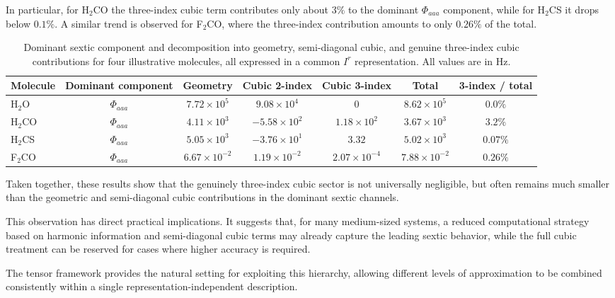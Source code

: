 \documentclass[aip,jcp,reprint,floatfix]{revtex4-2}
\begin{document}
In particular, for H$_2$CO the three-index cubic term contributes
only about $3\%$ to the dominant $\Phi_{aaa}$ component, while for
H$_2$CS it drops below $0.1\%$. A similar trend is observed for
F$_2$CO, where the three-index contribution amounts to only
$0.26\%$ of the total.

\begin{table}[t]
\centering
\caption{Dominant sextic component and decomposition into geometry,
semi-diagonal cubic, and genuine three-index cubic contributions for
four illustrative molecules, all expressed in a common $I^r$
representation. All values are in Hz.}

\begin{tabular}{lcccccc}
\hline
Molecule & Dominant component & Geometry & Cubic 2-index & Cubic 3-index & Total & 3-index / total \\
\hline
H$_2$O  & $\Phi_{aaa}$ & $7.72\times10^5$ & $9.08\times10^4$ & $0$ & $8.62\times10^5$ & $0.0\%$ \\
H$_2$CO & $\Phi_{aaa}$ & $4.11\times10^3$ & $-5.58\times10^2$ & $1.18\times10^2$ & $3.67\times10^3$ & $3.2\%$ \\
H$_2$CS & $\Phi_{aaa}$ & $5.05\times10^3$ & $-3.76\times10^1$ & $3.32$ & $5.02\times10^3$ & $0.07\%$ \\
F$_2$CO & $\Phi_{aaa}$ & $6.67\times10^{-2}$ & $1.19\times10^{-2}$ & $2.07\times10^{-4}$ & $7.88\times10^{-2}$ & $0.26\%$ \\
\hline
\end{tabular}

\label{tab:sextic_cubic_hierarchy}
\end{table}

Taken together, these results show that the genuinely three-index
cubic sector is not universally negligible, but often remains much
smaller than the geometric and semi-diagonal cubic contributions in
the dominant sextic channels.

This observation has direct practical implications. It suggests that,
for many medium-sized systems, a reduced computational strategy based
on harmonic information and semi-diagonal cubic terms may already
capture the leading sextic behavior, while the full cubic treatment
can be reserved for cases where higher accuracy is required.

The tensor framework provides the natural setting for exploiting this
hierarchy, allowing different levels of approximation to be combined
consistently within a single representation-independent description.
\end{document}
